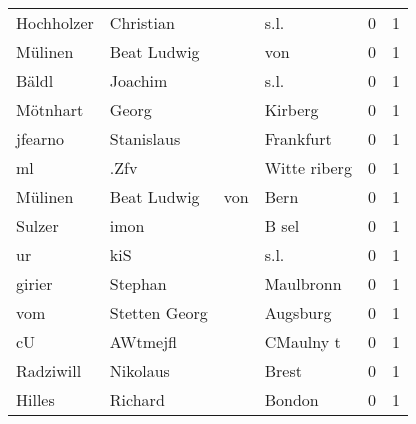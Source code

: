 \begin{center}
\begin{tiny}
\begin{longtabu}{llllrr}
               Hochholzer &                          Christian &             &                                        s.l. &          0 &         1 \\
                  Mülinen &                        Beat Ludwig &             &                                         von &          0 &         1 \\
                    Bäldl &                            Joachim &             &                                        s.l. &          0 &         1 \\
                 Mötnhart &                              Georg &             &                                     Kirberg &          0 &         1 \\
                  jfearno &                         Stanislaus &             &                                   Frankfurt &          0 &         1 \\
                       ml &                               .Zfv &             &                                Witte riberg &          0 &         1 \\
                  Mülinen &                        Beat Ludwig &         von &                                        Bern &          0 &         1 \\
                   Sulzer &                               imon &             &                                       B sel &          0 &         1 \\
                       ur &                                kiS &             &                                        s.l. &          0 &         1 \\
                   girier &                            Stephan &             &                                   Maulbronn &          0 &         1 \\
                      vom &                      Stetten Georg &             &                                    Augsburg &          0 &         1 \\
                       cU &                           AWtmejfl &             &                                   CMaulny t &          0 &         1 \\
                Radziwill &                           Nikolaus &             &                                       Brest &          0 &         1 \\
                   Hilles &                            Richard &             &                                      Bondon &          0 &         1 \\

\end{longtabu}
\end{tiny}
\end{center}
